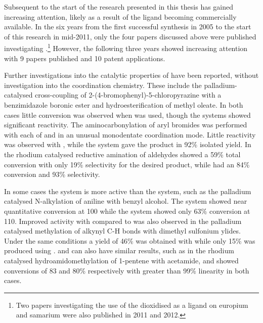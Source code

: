 Subsequent to the start of the research presented in this thesis \tBuxantphos{} has gained increasing attention, likely as a result of the ligand becoming commercially available.  In the six years 
from the first successful synthesis in 2005 to the start of this research in mid-2011, only the four papers discussed above were published investigating \tBuxantphos{}.\footnote{Two papers investigating the use of the dioxidised \tBuxantphos{} as a ligand on europium and samarium were also published in 2011 and 2012.\cite{Miyata2011, Miyata2012}}  However, the following three years showed increasing attention with 9 papers published\cite{Friis2014, Dang2013, Liu2013c, Raoufmoghaddam2013, Haibach2013, Ashcroft2013, Behr2013, Raoufmoghaddam2013b, Zhan2012} and 10 patent applications.\cite{Shang2010, Shang2011a, Shang2011b, Shang2011c, Shang2012a, Brandstadt2013a, Brandstadt2013b, Brandstadt2013c, Brandstadt2013d, Brandstadt2013e}

Further investigations into the catalytic properties of \tBuxantphos{} have been reported, without investigation into the coordination chemistry.  These include the  palladium-catalysed cross-coupling of 2-(4-bromophenyl)-5-chloropyrazine with a benzimidazole boronic ester and hydroesterification of methyl oleate.\cite{Ashcroft2013, Behr2013} In both cases little conversion was observed when \tBuxantphos{} was used, though the \Phxantphos{} systems showed significant reactivity.  The aminocarbonylation of aryl bromides was performed with each of \Phxantphos{} and \tBuxantphos{} in an unusual monodentate coordination mode.\cite{Friis2014}  Little reactivity was observed with \tBuxantphos{}, while the \Phxantphos{} system gave the product in 92\% isolated yield.  In the rhodium catalysed reductive amination of aldehydes \tBuxantphos{} showed a 59\% total conversion with only 19\% selectivity for the desired product, while \Phxantphos{} had an 84\% conversion and 93\% selectivity.\cite{Raoufmoghaddam2013}   

In some cases the \tBuxantphos{} system is more active than the \Phxantphos{} system, such as the palladium catalysed N-alkylation of aniline with benzyl alcohol.\cite{Dang2013} The \tBuxantphos{} system showed near quantitative conversion at 100 \degC{} while the \Phxantphos{} system showed only 63\% conversion at 110\degC{}.  Improved activity with \tBuxantphos{} compared to \Phxantphos{} was also observed in the palladium catalysed methylation of alkynyl C-H bonds with dimethyl sulfonium ylides.\cite{Liu2013c}  Under the same conditions a yield of 46\% was obtained with \tBuxantphos{} while only 15\% was produced using \Phxantphos{}.  \tBuXantphos{} and \Phxantphos{} can also have similar results, such as in the rhodium catalysed hydroamidomethylation of 1-pentene with acetamide, \Phxantphos{} and \tBuxantphos{} showed conversions of 83 and 80\% respectively with greater than 99\% linearity in both cases.\cite{Raoufmoghaddam2013b}  


